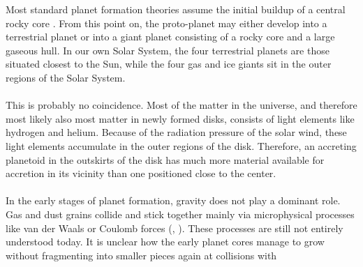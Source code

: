       Most standard planet formation theories assume the initial buildup of a 
      central rocky core \cite{Kley_1999}.
      From this point on, the proto-planet may either develop into a terrestrial 
      planet or into a giant planet consisting of a rocky core and a large 
      gaseous hull. In our own Solar System, the four terrestrial planets are 
      those situated closest to the Sun, while the four gas and ice giants sit 
      in the outer regions of the Solar System. \\
      \\
      This is probably no coincidence.
      Most of the matter in the universe, and therefore most likely also most 
      matter in 
      newly formed disks, consists of light elements like hydrogen and helium.
      Because of the radiation pressure of the solar wind, these light elements 
      accumulate in the outer regions of the disk. Therefore, an 
      accreting planetoid in the outskirts of the disk has much more material 
      available for accretion in its vicinity than one positioned close to the 
      center.
      \\
      \\
      In the early stages of planet formation, gravity does not play a dominant 
      role. Gas and dust grains collide and stick together mainly via 
      microphysical processes like van der Waals or Coulomb forces
      (\citeauthor{Ward_1996}, \citeyear{Ward_1996}).
      These processes are still not entirely understood today.
      It is unclear how the early planet cores manage to
      grow without fragmenting into smaller pieces again at collisions with 
